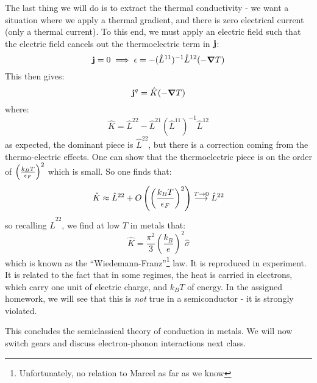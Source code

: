 The last thing we will do is to extract the thermal conductivity - we want a situation where we apply a thermal gradient, and there is zero electrical current (only a thermal current). To this end, we must apply an electric field such that the electric field cancels out the thermoelectric term in $\mathbf{j}$:
\begin{equation}
    \v{j} = 0 \implies \e = -(\hat{L}^{11})^{-1}\hat{L}^{12}(-\nabla T)
\end{equation}
This then gives:
\begin{equation}
    \v{j}^q = \hat{K}(-\nabla T)
\end{equation}
where:
\begin{equation}
    \hat{K} = \hat{L}^{22} - \hat{L}^{21}(\hat{L}^{11})^{-1}\hat{L}^{12}
\end{equation}
as expected, the dominant piece is $\hat{L}^{22}$, but there is a correction coming from the thermo-electric effects. One can show that the thermoelectric piece is on the order of $\left(\frac{k_B T}{\epsilon_F}\right)^2$ which is small. So one finds that:
\begin{equation}
    \hat{K} \approx \hat{L}^{22} + O\left(\left(\frac{k_B T}{\epsilon_F}\right)^2\right) \stackrel{T \to 0}{\longrightarrow} \hat{L}^{22}
\end{equation}
so recalling $\hat{L}^{22}$, we find at low $T$ in metals that:
\begin{equation}
    \hat{K} = \frac{\pi^2}{3}\left(\frac{k_B}{e}\right)^2 \hat{\sigma}
\end{equation}
which is known as the ``Wiedemann-Franz''\footnote{Unfortunately, no relation to Marcel as far as we know} law. It is reproduced in experiment. It is related to the fact that in some regimes, the heat is carried in electrons, which carry one unit of electric charge, and $k_B T$ of energy. In the assigned homework, we will see that this is \emph{not} true in a semiconductor - it is strongly violated. 

This concludes the semiclassical theory of conduction in metals. We will now switch gears and discuss electron-phonon interactions next class.